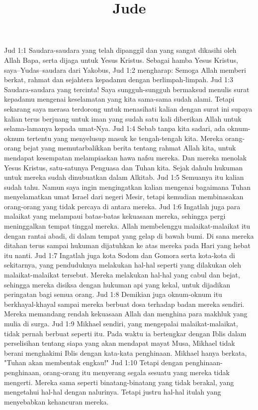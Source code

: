

\title{Jude}

Jud 1:1  Saudara-saudara yang telah dipanggil dan yang sangat dikasihi oleh Allah Bapa, serta dijaga untuk Yesus Kristus. Sebagai hamba Yesus Kristus, saya--Yudas--saudara dari Yakobus,
Jud 1:2  mengharap: Semoga Allah memberi berkat, rahmat dan sejahtera kepadamu dengan berlimpah-limpah.
Jud 1:3  Saudara-saudara yang tercinta! Saya sungguh-sungguh bermaksud menulis surat kepadamu mengenai keselamatan yang kita sama-sama sudah alami. Tetapi sekarang saya merasa terdorong untuk menasihati kalian dengan surat ini supaya kalian terus berjuang untuk iman yang sudah satu kali diberikan Allah untuk selama-lamanya kepada umat-Nya.
Jud 1:4  Sebab tanpa kita sadari, ada oknum-oknum tertentu yang menyelusup masuk ke tengah-tengah kita. Mereka orang-orang bejat yang memutarbalikkan berita tentang rahmat Allah kita, untuk mendapat kesempatan melampiaskan hawa nafsu mereka. Dan mereka menolak Yesus Kristus, satu-satunya Penguasa dan Tuhan kita. Sejak dahulu hukuman untuk mereka sudah dinubuatkan dalam Alkitab.
Jud 1:5  Semuanya itu kalian sudah tahu. Namun saya ingin mengingatkan kalian mengenai bagaimana Tuhan menyelamatkan umat Israel dari negeri Mesir, tetapi kemudian membinasakan orang-orang yang tidak percaya di antara mereka.
Jud 1:6  Ingatlah juga para malaikat yang melampaui batas-batas kekuasaan mereka, sehingga pergi meninggalkan tempat tinggal mereka. Allah membelenggu malaikat-malaikat itu dengan rantai abadi, di dalam tempat yang gelap di bawah bumi. Di sana mereka ditahan terus sampai hukuman dijatuhkan ke atas mereka pada Hari yang hebat itu nanti.
Jud 1:7  Ingatlah juga kota Sodom dan Gomora serta kota-kota di sekitarnya, yang penduduknya melakukan hal-hal seperti yang dilakukan oleh malaikat-malaikat tersebut. Mereka melakukan hal-hal yang cabul dan bejat, sehingga mereka disiksa dengan hukuman api yang kekal, untuk dijadikan peringatan bagi semua orang.
Jud 1:8  Demikian juga oknum-oknum itu berkhayal-khayal sampai mereka berbuat dosa terhadap badan mereka sendiri. Mereka memandang rendah kekuasaan Allah dan menghina para makhluk yang mulia di surga.
Jud 1:9  Mikhael sendiri, yang mengepalai malaikat-malaikat, tidak pernah berbuat seperti itu. Pada waktu ia bertengkar dengan Iblis dalam perselisihan tentang siapa yang akan mendapat mayat Musa, Mikhael tidak berani menghakimi Iblis dengan kata-kata penghinaan. Mikhael hanya berkata, "Tuhan akan membentak engkau!"
Jud 1:10  Tetapi dengan penghinaan-penghinaan, orang-orang itu menyerang segala sesuatu yang mereka tidak mengerti. Mereka sama seperti binatang-binatang yang tidak berakal, yang mengetahui hal-hal dengan nalurinya. Tetapi justru hal-hal itulah yang menyebabkan kehancuran mereka.
